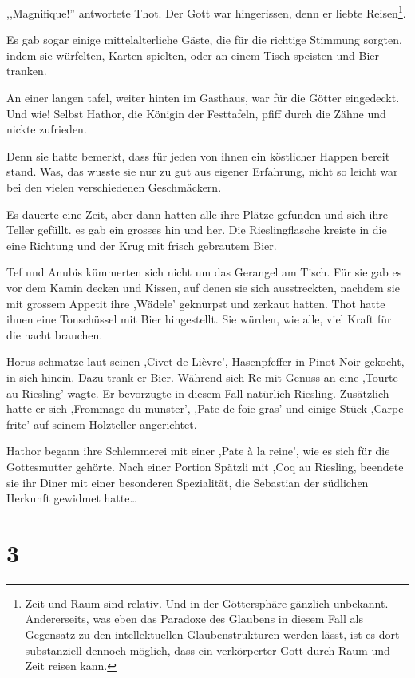 ,,Magnifique!'' antwortete Thot. Der Gott war hingerissen, denn er liebte Reisen\footnote{Zeit und Raum sind relativ. Und in der Göttersphäre gänzlich unbekannt. Andererseits, was eben das Paradoxe des Glaubens in diesem Fall als Gegensatz zu den intellektuellen Glaubenstrukturen werden lässt, ist es dort substanziell dennoch möglich, dass ein verkörperter Gott durch Raum und Zeit reisen kann.}.

Es gab sogar einige mittelalterliche Gäste, die für die richtige Stimmung sorgten, indem sie würfelten, Karten spielten, oder an einem Tisch speisten und Bier tranken.

An einer langen tafel, weiter hinten im Gasthaus, war für die Götter eingedeckt. Und wie! Selbst Hathor, die Königin der Festtafeln, pfiff durch die Zähne und nickte zufrieden. 

Denn sie hatte bemerkt, dass für jeden von ihnen ein köstlicher Happen bereit stand. Was, das wusste sie nur zu gut aus eigener Erfahrung, nicht so leicht war bei den vielen verschiedenen Geschmäckern.

Es dauerte eine Zeit, aber dann hatten alle ihre Plätze gefunden und sich ihre Teller gefüllt. es gab ein grosses hin und her. Die Rieslingflasche kreiste in die eine Richtung und der Krug mit frisch gebrautem Bier.

Tef und Anubis kümmerten sich nicht um das Gerangel am Tisch. Für sie gab es vor dem Kamin decken und Kissen, auf denen sie sich ausstreckten, nachdem sie mit grossem Appetit ihre ,Wädele' geknurpst und zerkaut hatten. Thot hatte ihnen eine Tonschüssel mit Bier hingestellt. Sie würden, wie alle, viel Kraft für die nacht brauchen.

Horus schmatze laut seinen ,Civet de Lièvre', Hasenpfeffer in Pinot Noir gekocht, in sich hinein. Dazu trank er Bier. Während sich Re mit Genuss an eine ,Tourte au Riesling' wagte. Er bevorzugte in diesem Fall natürlich Riesling. Zusätzlich hatte er sich ,Frommage du munster', ,Pate de foie gras' und einige Stück ,Carpe frite' auf seinem Holzteller angerichtet.

Hathor begann ihre Schlemmerei mit einer ,Pate à la reine', wie es sich für die Gottesmutter gehörte. Nach einer Portion Spätzli mit ,Coq au Riesling, beendete sie ihr Diner mit einer besonderen Spezialität, die Sebastian der südlichen Herkunft gewidmet hatte\dots

\section*{3}

